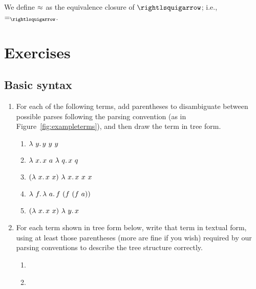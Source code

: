 \begin{definition}
\label{def:betaeq}
  We define $\approx$ as the equivalence closure of $\betaa$; i.e., $=_{\betaa}$.
  \end{definition}

\section{Exercises}

\subsection{Basic syntax}

\begin{enumerate}

  \item For each of the following terms, add parentheses to disambiguate
between possible parses following the parsing convention (as in
Figure~\ref{fig:exampleterms}), and then draw the term in tree form.

\begin{enumerate}
\item $\lambda\ y.\, y\ y\ y$
\item $\lam{x}{x\ a\ \lam{q}{x\ q}}$
\item $(\lam{x}{x\ x})\ \lam{x}{x\ x\ x}$
\item $\lam{f}{\lam{a}{f\ (f\ (f\ a))}}$
\item $(\lam{x}{x\ x})\ \lam{y}{x}$
\end{enumerate}

\item For each term shown in tree form below, write that term in
  textual form, using at least those parentheses (more are fine if you
  wish) required by our parsing conventions to describe the tree
  structure correctly.


  \begin{enumerate}
  \item

    \


  \item

    \


\end{enumerate}
\end{enumerate}
